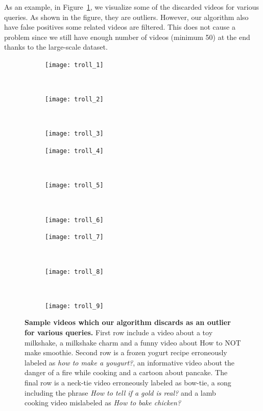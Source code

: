 As an example, in Figure~\ref{outliers}, we visualize some of the discarded videos for various queries. As shown in the figure, they are outliers. However, our algorithm also have false positives \ie some related videos are filtered. This does not cause a problem since we still have enough number of videos (minimum 50) at the end thanks to the large-scale dataset. 
\begin{figure}[ht]
  \begin{subfigure}[b]{0.16\textwidth}
    \texttt{[image: troll\_1]}
  \end{subfigure}~
  \begin{subfigure}[b]{0.16\textwidth}
    \texttt{[image: troll\_2]}
  \end{subfigure}~
  \begin{subfigure}[b]{0.16\textwidth}
    \texttt{[image: troll\_3]}
    \end{subfigure}

    \begin{subfigure}[b]{0.16\textwidth}
      \texttt{[image: troll\_4]}
    \end{subfigure}~
    \begin{subfigure}[b]{0.16\textwidth}
      \texttt{[image: troll\_5]}
    \end{subfigure}~
    \begin{subfigure}[b]{0.16\textwidth}
      \texttt{[image: troll\_6]}
  \end{subfigure}

  \begin{subfigure}[b]{0.16\textwidth}
    \texttt{[image: troll\_7]}
  \end{subfigure}~
  \begin{subfigure}[b]{0.16\textwidth}
    \texttt{[image: troll\_8]}
  \end{subfigure}~
  \begin{subfigure}[b]{0.16\textwidth}
    \texttt{[image: troll\_9]}
\end{subfigure}

\caption{\textbf{Sample videos which our algorithm discards as an outlier for various queries.}
First row include a video about a toy milkshake, a milkshake charm and a funny video about How to NOT make smoothie. Second row is a frozen yogurt recipe erroneously labeled as \emph{how to make a yougurt?}, an informative video about the danger of a fire while cooking and a cartoon about pancake. The final row is a neck-tie video erroneously labeled as bow-tie, a song including the phrase \emph{How to tell if a gold is real?} and a lamb cooking video mislabeled as \emph{How to bake chicken?}}
\label{outliers}
\end{figure}

